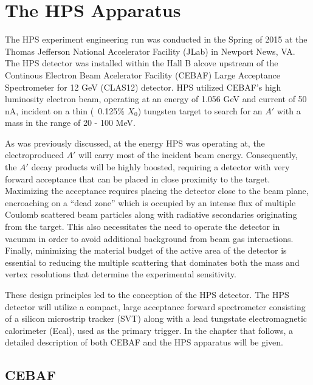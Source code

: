 
\chapter{The HPS Apparatus}

The HPS experiment engineering run was conducted in the Spring of 2015 at the
Thomas Jefferson National Accelerator Facility (JLab) in Newport News, VA.  The
HPS detector was installed within the Hall B alcove upstream of the Continous 
Electron Beam Acelerator Facility (CEBAF) Large Acceptance Spectrometer for 12
GeV (CLAS12) detector.  HPS utilized CEBAF's high luminosity electron beam,
operating at an energy of 1.056 GeV and current of 50 nA, incident on a thin
(~0.125\% $X_{0}$) tungsten target to search for an $A'$ with a mass in the 
range of 20 - 100 MeV.  

As was previously discussed, at the energy HPS was operating at, the 
electroproduced $A'$ will carry most of the incident beam energy.  Consequently,
the $A'$ decay products will be highly boosted, requiring a detector with very
forward acceptance that can be placed in close proximity to the target.
Maximizing the acceptance requires placing the detector close to the beam plane,
encroaching on a ``dead zone'' which is occupied by an intense flux of multiple
Coulomb scattered beam particles along with radiative secondaries originating
from the target.  This also necessitates the need to operate the detector in 
vacumm in order to avoid additional background from beam gas interactions. 
Finally, minimizing the material budget of the active area of the detector is 
essential to reducing the multiple scattering that dominates both the mass and
vertex resolutions that determine the experimental sensitivity.

These design principles led to the conception of the HPS detector.  The HPS 
detector will utilize a compact, large acceptance forward spectrometer 
consisting of a silicon microstrip tracker (SVT) along with a lead tungstate
electromagnetic calorimeter (Ecal), used as the primary trigger.  In the chapter
that follows, a detailed description of both CEBAF and the HPS apparatus will be
given.

\section{CEBAF}

